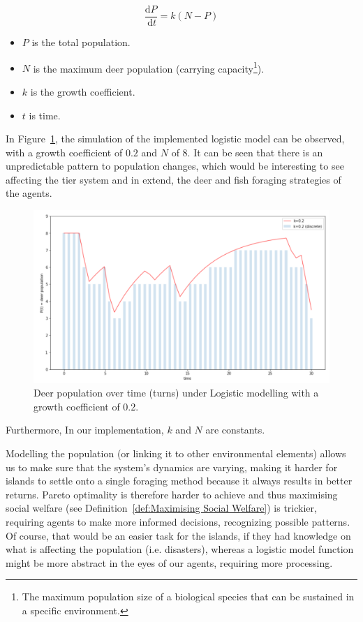 \begin{equation}
\frac{\mathrm{d} P}{\mathrm{~d} t}=k(N-P)
\label{eq:Population Density}
\end{equation}

\begin{itemize}
    \item $P$ is the total population. 
    \item $N$ is the maximum deer population (carrying capacity\footnote{The maximum population size of a biological species that can be sustained in a specific environment.}).
    \item $k$ is the growth coefficient.
    \item $t$ is time.
\end{itemize}

In Figure~\ref{fig:Deer population over time}, the simulation of the implemented logistic model can be observed, with a growth coefficient of $0.2$ and $N$ of $8$. It can be seen that there is an unpredictable pattern to population changes, which would be interesting to see affecting the tier system and in extend, the deer and fish foraging strategies of the agents.

\begin{figure}[!htb]
    \centering
    \includegraphics[width=1\textwidth]{04_environment/images/Deer population over time.PNG}
    \caption{Deer population over time (turns) under Logistic modelling with a growth coefficient of 0.2.}
    \label{fig:Deer population over time}
\end{figure}

Furthermore, In our implementation, $k$ and $N$ are constants. 

Modelling the population (or linking it to other environmental elements) allows us to make sure that the system’s dynamics are varying, making it harder for islands to settle onto a single foraging method because it always results in better returns. Pareto optimality is therefore harder to achieve and thus maximising social welfare (see Definition~\ref{def:Maximising Social Welfare}) is trickier, requiring agents to make more informed decisions, recognizing possible patterns. Of course, that would be an easier task for the islands, if they had knowledge on what is affecting the population (i.e. disasters), whereas a logistic model function might be more abstract in the eyes of our agents, requiring more processing. 

